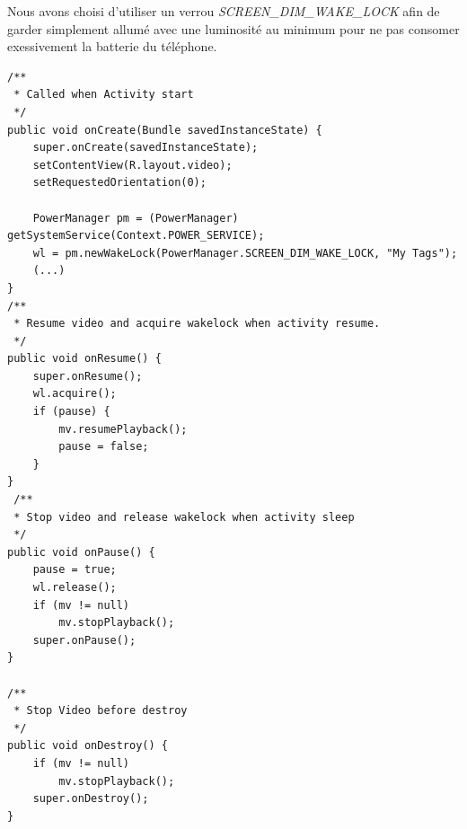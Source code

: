 Nous avons choisi d'utiliser un verrou \textit{SCREEN\_DIM\_WAKE\_LOCK} afin de
garder simplement allumé avec une luminosité au minimum pour ne pas consomer
exessivement la batterie du téléphone.
\newpage
 \begin{lstlisting}[caption={Video
life-cycle}] 
/**
 * Called when Activity start
 */
public void onCreate(Bundle savedInstanceState) {
	super.onCreate(savedInstanceState);
	setContentView(R.layout.video);
	setRequestedOrientation(0);
	
	PowerManager pm = (PowerManager) getSystemService(Context.POWER_SERVICE);
	wl = pm.newWakeLock(PowerManager.SCREEN_DIM_WAKE_LOCK, "My Tags");
	(...)
}
/**
 * Resume video and acquire wakelock when activity resume.
 */
public void onResume() {
	super.onResume();
	wl.acquire();
	if (pause) {
	    mv.resumePlayback();
	    pause = false;
	}
}
 /**
 * Stop video and release wakelock when activity sleep
 */
public void onPause() {
	pause = true;
	wl.release();
	if (mv != null)
	    mv.stopPlayback();
	super.onPause();
}

/**
 * Stop Video before destroy
 */
public void onDestroy() {
	if (mv != null)
	    mv.stopPlayback();
	super.onDestroy();
}
\end{lstlisting}
